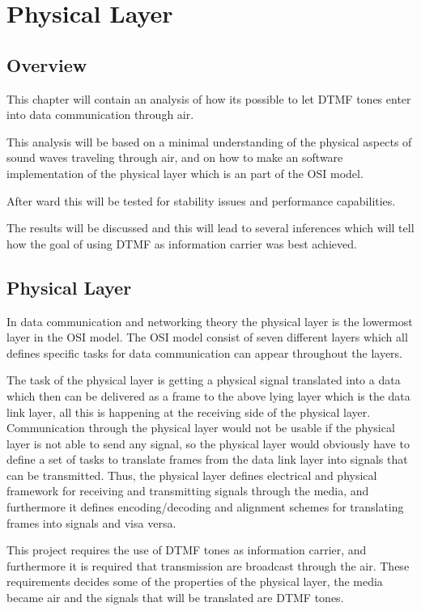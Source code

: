 \section{Physical Layer}

	\subsection{Overview}
	This chapter will contain an analysis of how its possible to let DTMF tones
	enter into data communication through air.
	
	This analysis will be based on a minimal understanding of the physical aspects
	of sound waves traveling through air, and on how to make an software
	implementation of the physical layer which is an part of the OSI model.
	
	After ward this will be tested for stability issues and performance capabilities.
	
	The results will be discussed and this will lead to several inferences which will
	tell how the goal of using DTMF as information carrier was best achieved.
	
	\subsection{Physical Layer}
	In data communication and networking theory the physical layer is the lowermost
	layer in the OSI model. The OSI model consist of seven different layers which all
	defines specific tasks for data communication can appear throughout the layers.
	
	The task of the physical layer is getting a physical signal translated into a data which
	then can be delivered as a frame to the above lying layer which is the data link layer,
	all this is happening at the receiving side of the physical layer. Communication through
	the physical layer would not be usable if the physical layer is not able to send any signal,
	so the physical layer would obviously have to define a set of tasks to translate frames from
	the data link layer into signals that can be transmitted. Thus, the physical layer defines
	electrical and physical framework for receiving and transmitting signals through the media,
	and furthermore it defines encoding/decoding and alignment schemes for translating
	frames into signals and visa versa.
	
	This project requires the use of DTMF tones as information carrier, and furthermore it is
	required that transmission are broadcast through the air. These requirements decides some
	of the properties of the physical layer, the media became air and the signals that will be
	translated are DTMF tones.
	
